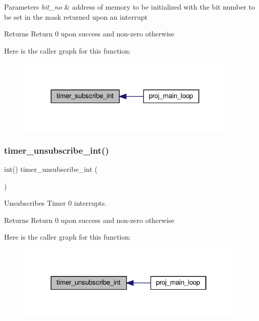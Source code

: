 \begin{DoxyParams}{Parameters}
{\em bit\+\_\+no} & address of memory to be initialized with the bit number to be set in the mask returned upon an interrupt \\
\hline
\end{DoxyParams}
\begin{DoxyReturn}{Returns}
Return 0 upon success and non-\/zero otherwise 
\end{DoxyReturn}
Here is the caller graph for this function\+:\nopagebreak
\begin{figure}[H]
\begin{center}
\leavevmode
\includegraphics[width=299pt]{group__timer_gac57a7e1140a7e00ad95ac5488d2a671b_icgraph}
\end{center}
\end{figure}
\mbox{\label{group__timer_gafabd21de449be154dd65d5fdb2d8045d}} 
\subsubsection{\texorpdfstring{timer\+\_\+unsubscribe\+\_\+int()}{timer\_unsubscribe\_int()}}
{\footnotesize\ttfamily int() timer\+\_\+unsubscribe\+\_\+int (\begin{DoxyParamCaption}{ }\end{DoxyParamCaption})}



Unsubscribes Timer 0 interrupts. 

\begin{DoxyReturn}{Returns}
Return 0 upon success and non-\/zero otherwise 
\end{DoxyReturn}
Here is the caller graph for this function\+:\nopagebreak
\begin{figure}[H]
\begin{center}
\leavevmode
\includegraphics[width=310pt]{group__timer_gafabd21de449be154dd65d5fdb2d8045d_icgraph}
\end{center}
\end{figure}


